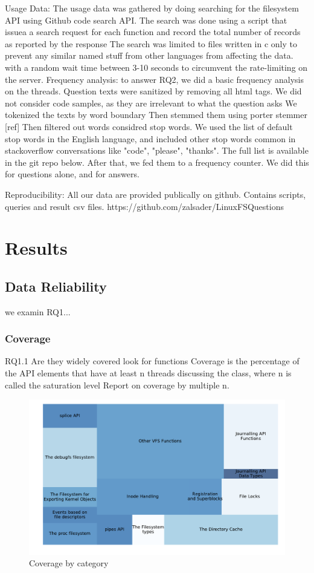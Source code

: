 Usage Data: The usage data was gathered by doing searching for the filesystem API using Github code search API. The search was done using a script that issuea a search request for each function and record the total number of records as reported by the response The search was limited to files written in c only to prevent any similar named stuff from other languages from affecting the data.
with a random wait time between 3-10 seconds to circumvent the rate-limiting on the server.
Frequency analysis: to answer RQ2, we did a basic frequency analysis on the threads.
Question texts were sanitized by removing all html tags.
We did not consider code samples, as they are irrelevant to what the question asks
We tokenized the texts by word boundary
Then stemmed them using porter stemmer [ref]
Then filtered out words considred stop words. We used the list of default stop words in the English language, and included other stop words common in stackoverflow conversations like "code", "please", "thanks". The full list is available in the git repo below.
After that, we fed them to a frequency counter.
We did this for questions alone, and for answers.

Reproducibility:
All our data are provided publically on github. Contains scripts, queries and result csv files.
https://github.com/zalsader/LinuxFSQuestions

\section{Results}
\subsection{Data Reliability}
we examin RQ1...
\subsubsection{Coverage}
RQ1.1
Are they widely covered
look for functions
Coverage is the percentage of the API elements that have at least n threads discussing
the class, where n is called the saturation level
Report on coverage by multiple n. %
\begin{figure}
  \includegraphics{scripts/figures/1-1-coveragebycategory.pdf}
  \caption{Coverage by category}
  \label{covbycategory}
\end{figure}

